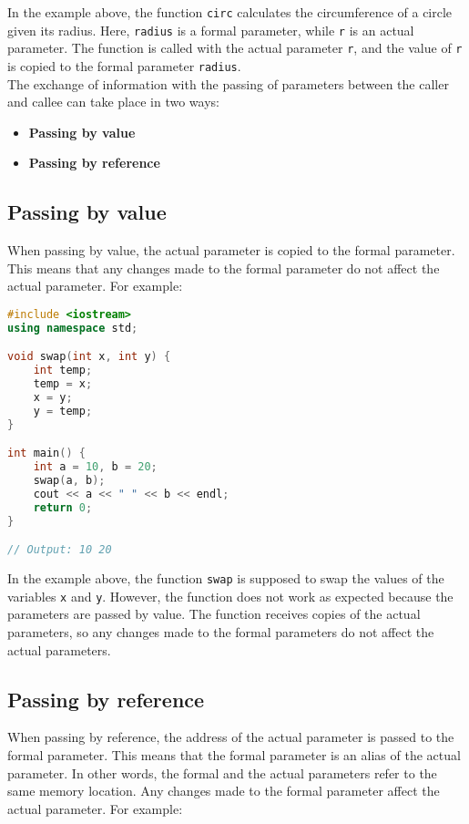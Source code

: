 In the example above, the function \texttt{circ} calculates the circumference of
a circle given its radius. Here, \texttt{radius} is a formal parameter, while
\texttt{r} is an actual parameter. The function is called with the actual
parameter \texttt{r}, and the value of \texttt{r} is copied to the formal
parameter \texttt{radius}.\\

The exchange of information with the passing of parameters between the caller and callee
can take place in two ways:

\begin{itemize}
    \item \textbf{Passing by value}
    \item \textbf{Passing by reference}
\end{itemize}

\subsection{Passing by value}

When passing by value, the actual parameter is copied to the formal parameter.
This means that any changes made to the formal parameter do not affect the 
actual parameter. For example:

\begin{lstlisting}[language=C++]
#include <iostream>
using namespace std;

void swap(int x, int y) {
    int temp;
    temp = x;
    x = y;
    y = temp;
}

int main() {
    int a = 10, b = 20;
    swap(a, b);
    cout << a << " " << b << endl;
    return 0;
}

// Output: 10 20
\end{lstlisting}

In the example above, the function \texttt{swap} is supposed to swap the values
of the variables \texttt{x} and \texttt{y}. However, the function does not work
as expected because the parameters are passed by value. The function receives
copies of the actual parameters, so any changes made to the formal parameters do
not affect the actual parameters.\\

\subsection{Passing by reference}

When passing by reference, the address of the actual parameter is passed to the
formal parameter. This means that the formal parameter is an alias of the actual
parameter. In other words, the formal and the actual parameters refer to the same
memory location. Any changes made to the formal parameter affect the actual
parameter. For example:\\

